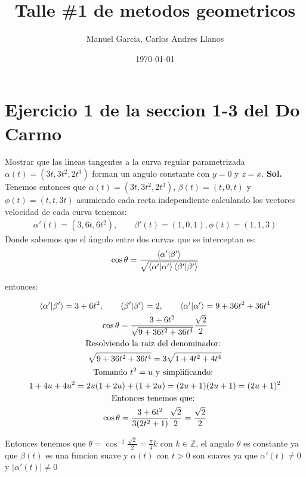 \documentclass{article}
\title{Talle \#1 de metodos geometricos}
\author{Manuel Garcia, Carlos Andres Llanos}
\date{\today}
\begin{document}
\maketitle

\section{Ejercicio 1 de la seccion 1-3 del Do Carmo}
Mostrar que las lineas tangentes a la curva regular parametrizada $ \alpha(t) = (3t,3t ^2, 2t ^ {3 }) $ forman un angulo constante con $ y = 0  $ y $ z = x  $. 
\textbf{Sol.} Tenemos entonces que $ \alpha(t) = (3t,3t ^2, 2t ^ {3 }) $, $ \beta(t) = (t,0,t) $ y $ \phi(t) = (t,t,3t) $ asumiendo cada recta independiente calculando los vectores velocidad de cada curva tenemos: 
\begin{gather*}
  \alpha'(t) = (3, 6t, 6t ^2), \qquad \beta'(t) = (1,0,1), \phi(t) = (1,1,3) 
\end{gather*}
Donde sabemos que el ángulo entre dos curvas que se interceptan es: 
\begin{gather*}
  \cos{\theta} = \frac{\bra{\alpha' }\ket{\beta' } }{\sqrt{\bra{\alpha' }\ket{\alpha' } \bra{\beta' }\ket{\beta' } } }
\end{gather*}

entonces: 

\begin{gather*}
  \bra{\alpha'}\ket{\beta' } = 3 + 6t ^2, \qquad \bra{\beta' }\ket{\beta'} = 2, \qquad \bra{\alpha' }\ket{\alpha' } = 9 + 36t ^2 + 36t ^ {4 }\\
\cos{\theta} = \frac{3+ 6t ^2}{\sqrt{9 + 36t ^2 + 36 t ^ {4 }} }\frac{\sqrt{2 } }{2}\\
\text{Resolviendo la raiz del denominador: }\\
\sqrt{9 + 36 t ^2 + 36 t ^ {4 }}  = 3 \sqrt{1 + 4 t ^2 + 4 t ^ {4 }} \\
\text{Tomando }t ^2 = u \text{ y simplificando: }\\
1 + 4 u + 4 u ^2 = 2u (1 + 2u) + (1+ 2u ) = (2u + 1)(2u+ 1) = (2u + 1)^2\\
\text{Entonces tenemos que: }\\
\cos{\theta} = \frac{3 + 6 t ^2 }{3(2t ^2+ 1)}\frac{\sqrt{2 } }{2} = \frac{\sqrt{2 } }{2}
\end{gather*}

Entonces tenemos que $ \theta = \cos^ {-1 }{\frac{\sqrt{2 } }{2}} = \frac{\pi}{4}k  $ con $ k \in \mathbb{Z} $, el angulo $ \theta  $ es constante ya que $ \beta(t) $ es una funcion suave y $ \alpha(t)  $ con $ t>0  $ son suaves ya que $ \alpha'(t) \neq 0  $ y $ \left|\alpha'(t)\right|\neq 0 $
\end{document}

